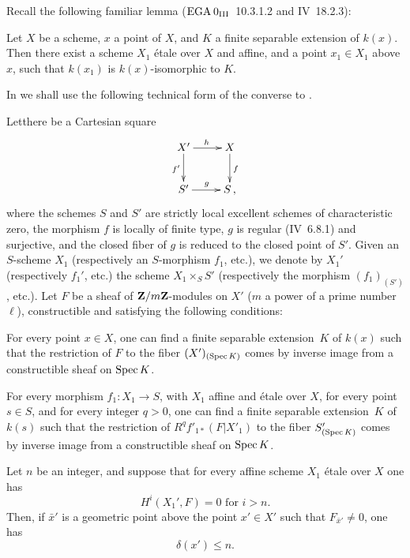 Recall the following familiar lemma (\cf $\textup{EGA}\kern.2em 0_{\textup{III}}$~10.3.1.2 and \EGA IV~18.2.3):

\begin{lemme} \label{XIV.3.4}
Let $X$ be a scheme, $x$ a point of $X$, and $K$ a finite separable extension of $k(x)$. Then there exist a scheme $X_1$ étale over $X$ and affine, and a point $x_1 \in X_1$ above $x$, such that $k(x_1)$ is $k(x)$-isomorphic to $K$.
\end{lemme}

In \numero {} we shall use the following technical form of the converse to .

\begin{proposition} \label{XIV.3.5}
Let\pageoriginale there be a Cartesian square
$$
\xymatrix{
{X'}\ar[r]^h\ar[d]_{f'} &{X}\ar[d]^f\\
{S'}\ar[r]^g &{S}\,,
}
$$
where the schemes $S$ and $S'$ are strictly local excellent schemes of characteristic zero, the morphism $f$ is locally of finite type, $g$ is regular (\textup{\EGA IV~6.8.1}) and surjective, and the closed fiber of $g$ is reduced to the closed point of $S'$. Given an $S$-scheme $X_1$ (respectively an $S$-morphism $f_1$, etc.), we denote by $X_1'$ (respectively $f_1'$, etc.) the scheme $X_1 \times_S S'$ (respectively the morphism $(f_1)_{(S')}$, etc.). Let $F$ be a sheaf of $\mathbf Z/m\mathbf Z$-modules on $X'$ ($m$ a power of a prime number $\ell$), constructible and satisfying the following conditions:
\begin{enumeratei}
\item
For every point $x \in X$, one can find a finite separable extension~$K$ of $k(x)$ such that the restriction of $F$ to the fiber $(X')_{(\operatorname{Spec} K)}$ comes by inverse image from a constructible sheaf on $\operatorname{Spec} K$.
\item
For every morphism $f_1: X_1 \to S$, with $X_1$ affine and étale over $X$, for every point $s \in S$, and for every integer $q>0$, one can find a finite separable extension~$K$ of $k(s)$ such that the restriction of $R^q f'_{1*}(F|X'_1)$ to the fiber $S'_{(\operatorname{Spec} K)}$ comes by inverse image from a constructible sheaf on $\operatorname{Spec} K$.
\end{enumeratei}

Let $n$ be an integer, and suppose that for every affine scheme $X_1$ étale over $X$ one has\pageoriginale
$$
H^i(X_1', F)=0 \text{ for } i>n.
$$
Then, if $\bar{x}'$ is a geometric point above the point $x' \in X'$ such that $F_{\bar{x}'} \neq 0$, one has
$$
\delta(x') \leq n.
$$
\end{proposition}

